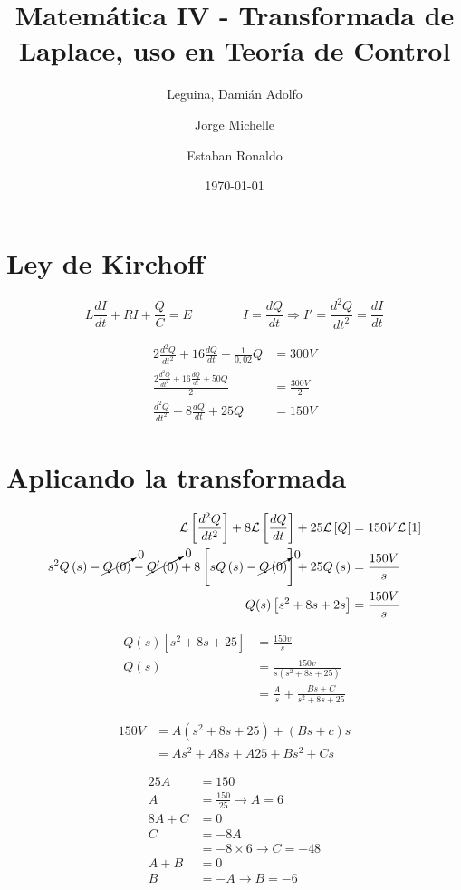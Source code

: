\documentclass{article}
\title{Matemática IV - Transformada de Laplace, uso en Teoría de Control}
\author{
    Leguina, Damián Adolfo
    \and
    Jorge Michelle
    \and
    Estaban Ronaldo
}
\date{\today}
\begin{document}
\section*{Ley de Kirchoff}

\[
    L \frac{d I}{d t} + RI + \frac{Q}{C} = E 
    \qquad\qquad
    I = \frac{d Q}{d t}
    \Rightarrow 
    \boxed{
        I' = \frac{d^2Q}{d t^2}
    } = \frac{d I}{ d t}
\]

\begin{align*}
    2 \frac{d^2 Q}{d t^2}
    + 16 \frac{d Q}{d t}
    + \frac{1}{0,02} Q
    &= 300 V \\
    \frac{
        2 \frac{d^2 Q}{d t^2}
        + 16 \frac{d Q}{d t} + 50 Q
        }{2}
    &= \frac{300 V}{2} \\
    \frac{d^2 Q}{d t^2}
    + 8 \frac{d Q}{d t}
    + 25 Q
    &= 150 V
\end{align*}


\section*{Aplicando la transformada}

\begin{align*}
    \mathcal{L}\left[\frac{d^2 Q}{d t^2}\right]
    + 8 \mathcal{L}\left[\frac{d Q}{d t}\right]
    + 25 \mathcal{L}\left[Q\right]
    &= 150 V \mathcal{L}\left[1\right] \\
    s^2 Q\left(s\right)
    - \cancelto{0}{Q\left(0\right)}
    - \cancelto{0}{Q'\left(0\right)}
    + 8 \left[sQ\left(s\right) - \cancelto{0}{Q\left(0\right)}\right]
    + 25 Q \left(s\right)
    &= \frac{150 V}{s} \\
    Q(s)\left[s^2 + 8 s + 2 s\right] &= \frac{150 V}{s}
\end{align*}

\begin{align*}
    Q\left(s\right)\left[s^2 + 8s + 25\right] &= \frac{150v}{s} \\
    Q\left(s\right) &= \frac{150v}{s\left(s^2 + 8s + 25\right)} \\
    &= \frac{A}{s} + \frac{Bs + C}{s^2 + 8s + 25}
\end{align*}

\begin{align*}
    150V &= A \left(s^2 + 8s + 25\right) + \left(Bs + c\right) s \\
    &= As^2 + A8s + A25 + Bs^2 + Cs
\end{align*}

\begin{align*}
    25A &= 150 \\
    A &= \frac{150}{25} \rightarrow \boxed{A = 6} \\
    8A + C &= 0 \\
    C &= -8A \\
    &= -8 \times 6 \rightarrow \boxed{C = -48} \\
    A + B &= 0 \\
    B &= -A \rightarrow \boxed{B = -6}
\end{align*}
\end{document}
